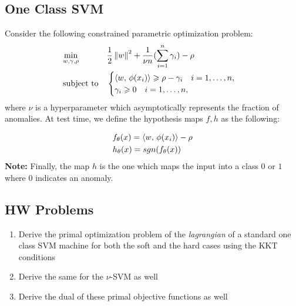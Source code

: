 \documentclass[11pt]{report}
\begin{document}
\subsection{One Class SVM}
Consider the following constrained parametric optimization problem:
\begin{align}
        \label{appen:nlmpp}
        \begin{aligned}
            &\operatorname*{min}_{w,\gamma,\rho}  && \frac{1}{2}\left\lVert w \right\rVert^2+\frac{1}{\nu n}(\sum_{i=1}^{n}\gamma_{i})  - \rho\\
            &\operatorname{subject\,\,to} && \begin{cases}
            \left\langle{w},\,{\phi(x_i)}\right\rangle \geqslant \rho - \gamma_i \quad i=1,\ldots,n,\\
           \gamma_i \geqslant 0 \quad i=1,\ldots,n,
            \end{cases}
        \end{aligned} \nonumber
    \end{align}
where \(\nu\) is a hyperparameter which asymptotically represents the fraction of anomalies.
\vspace{1mm}
At test time, we define the hypothesis maps \(f,h\) as the following:

\begin{align}
        \begin{aligned}
            & f_\theta(x)=\left\langle{w},\,{\phi(x_i)}\right\rangle - \rho\\
            & h_\theta(x)=sgn(f_\theta(x))
        \end{aligned} \nonumber
    \end{align}
\textbf{Note:} Finally, the map \(h\) is the one which maps the input into a class \(0\) or \(1\) where 0 indicates an anomaly.
\subsection{HW Problems}
\begin{enumerate}
    \item Derive the primal optimization problem of the \emph{lagrangian} of a standard one class SVM machine for both the soft and the hard cases using the KKT conditions
    \item Derive the same for the \(\nu\)-SVM as well
    \item Derive the dual of these primal objective functions as well
\end{enumerate}
\end{document}
